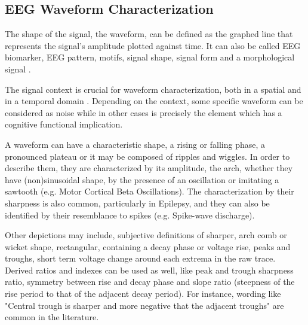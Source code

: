 \subsection{EEG Waveform Characterization}

The shape of the signal, the waveform, can be defined as the graphed line that represents the signal's amplitude plotted against time. It can also be called EEG biomarker,  EEG pattern, motifs, signal shape, signal form and a morphological signal \cite{Jansen1991}.

The signal context is crucial for waveform characterization, both in a spatial and in a temporal domain \cite{Jansen1991}.  Depending on the context, some specific waveform can be considered as noise while in other cases is precisely the element which has a cognitive functional implication.



%

A waveform can have a characteristic shape, a rising or falling phase, a pronounced plateau or it may be composed of ripples and wiggles. In order to describe them, they are characterized by its amplitude, the arch, whether they have (non)sinusoidal shape, by the presence of an oscillation or imitating a sawtooth (e.g. Motor Cortical Beta Oscillations).  The characterization by their sharpness is also common, particularly in Epilepsy, and they can also be identified by their resemblance to spikes (e.g. Spike-wave discharge).

Other depictions may include, subjective definitions of sharper, arch comb or wicket shape, rectangular, containing a decay phase or voltage rise, peaks and troughs, short term voltage change around each extrema in the raw trace.  Derived ratios and indexes can be used as well, like peak and trough sharpness ratio, symmetry between rise and decay phase and slope ratio (steepness of the rise period to that of the adjacent decay period).  For instance,  wording like "Central trough is sharper and more negative that the adjacent troughs" are common in the literature.

